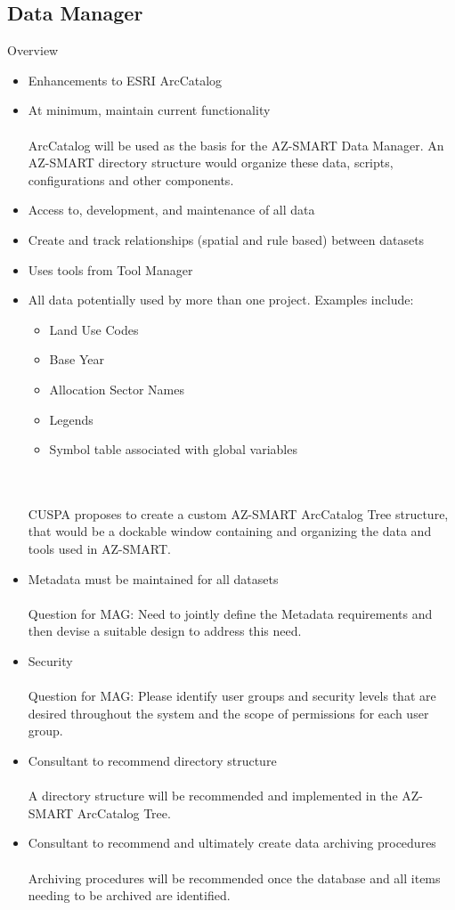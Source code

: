 \documentclass[titlepage]{article}
\begin{document}
\subsection{Data Manager}
Overview
\begin{itemize}
	\item Enhancements to ESRI ArcCatalog
	\item At minimum, maintain current functionality
	\\\\ ArcCatalog will be used as the basis for the AZ-SMART Data Manager.  An AZ-SMART directory structure would organize these data, scripts, configurations and other components.

	\item Access to, development, and maintenance of all data
	\item Create and track relationships (spatial and rule based) between datasets
	\item Uses tools from Tool Manager
	\item All data potentially used by more than one project. Examples include:
		\begin{itemize}
			\item Land Use Codes
			\item Base Year
			\item Allocation Sector Names
			\item Legends
			\item Symbol table associated with global variables
		\end{itemize}
	\\\\ CUSPA proposes to create a custom AZ-SMART ArcCatalog Tree structure, that would be a dockable window containing and organizing the data and tools used in AZ-SMART. 


	\item Metadata must be maintained for all datasets
	\\\\ Question for MAG: Need to jointly define the Metadata requirements and then devise a suitable design to address this need.
	\item Security
	\\\\
	Question for MAG: Please identify user groups and security levels that are desired throughout the system and the scope of permissions for each user group.

	\item Consultant to recommend directory structure
	\\\\ A directory structure will be recommended and implemented in the AZ-SMART ArcCatalog Tree.
	\item Consultant to recommend and ultimately create data archiving procedures
	\\\\ Archiving procedures will be recommended once the database and all items needing to be archived are identified.
\end{itemize}
\end{document}
